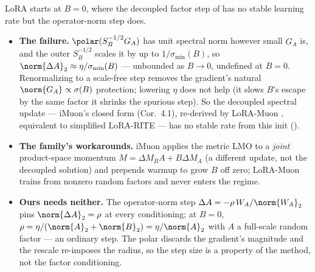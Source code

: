\begin{remark}[Why the operator-norm step is safe at the standard $B{=}0$ initialization]
\label{rem:b0}
LoRA starts at $B{=}0$, where the decoupled factor step of  has no stable learning rate but the operator-norm step does.
\begin{itemize}[leftmargin=1.5em,itemsep=1pt,topsep=2pt]
  \item \textbf{The failure.} $\polar(S_B^{-1/2}G_A)$ has unit spectral norm however small $G_A$ is, and the outer $S_B^{-1/2}$ scales it by up to $1/\sigma_{\min}(B)$, so $\norm{\Delta A}_2\approx\eta/\sigma_{\min}(B)$ --- unbounded as $B\to0$, undefined at $B{=}0$. Renormalizing to a scale-free step removes the gradient's natural $\norm{G_A}\propto\sigma(B)$ protection; lowering $\eta$ does not help (it slows $B$'s escape by the same factor it shrinks the spurious step). So the decoupled spectral update --- iMuon's closed form (Cor.\ 4.1), re-derived by LoRA-Muon \cite{loramuon}, equivalent to simplified LoRA-RITE \cite{lorarite} --- has no stable rate from this init ().
  \item \textbf{The family's workarounds.} iMuon applies the metric LMO to a \emph{joint} product-space momentum $M=\Delta M_BA+B\Delta M_A$ (a different update, not the decoupled solution) and prepends warmup to grow $B$ off zero; LoRA-Muon trains from nonzero random factors and never enters the regime.
  \item \textbf{Ours needs neither.} The operator-norm step $\Delta A=-\rho\,W_A/\norm{W_A}_2$ pins $\norm{\Delta A}_2=\rho$ at every conditioning; at $B{=}0$, $\rho=\eta/(\norm{A}_2+\norm{B}_2)=\eta/\norm{A}_2$ with $A$ a full-scale random factor --- an ordinary step. The polar discards the gradient's magnitude and the rescale re-imposes the radius, so the step size is a property of the method, not the factor conditioning.
\end{itemize}
\end{remark}

